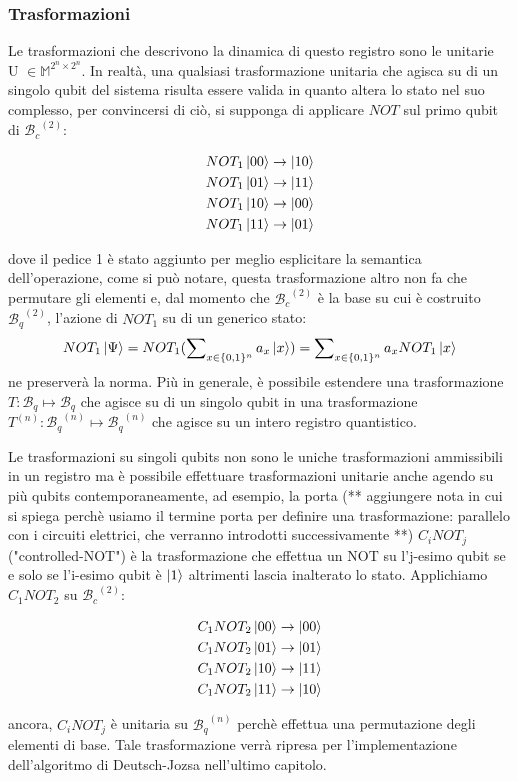 \documentclass[12pt,a4paper,openright]{report}
\begin{document}
\subsubsection{Trasformazioni}

Le trasformazioni che descrivono la dinamica di questo registro sono le unitarie \\U $\in \mathbb{M}^{2^n\times2^n}$.
In realtà, una qualsiasi trasformazione unitaria che agisca su di un singolo qubit del sistema risulta essere valida in quanto altera lo stato nel suo complesso,
per convincersi di ciò, si supponga di applicare $NOT$ sul primo qubit di ${\mathcal{B}_c}^{(2)}$:
\begin{center}
    \begin{align*}
        &NOT_1\ket{00} \rightarrow  \ket{10} \\
        &NOT_1\ket{01} \rightarrow  \ket{11} \\
        &NOT_1\ket{10} \rightarrow  \ket{00} \\
        &NOT_1\ket{11} \rightarrow  \ket{01}
    \end{align*}
\end{center}
dove il pedice 1 è stato aggiunto per meglio esplicitare la semantica dell'operazione, come si può notare, questa trasformazione altro non fa che permutare gli elementi
e, dal momento che ${\mathcal{B}_c}^{(2)}$ è la base su cui è costruito ${\mathcal{B}_q}^{(2)}$, l'azione di $NOT_1$ su di un generico stato:
\[
    NOT_1\ket{\Psi} = NOT_1(\sum\nolimits_{x \in \{0,1\}^{n}} a_x \ket{x}) = \sum\nolimits_{x \in \{0,1\}^{n}} a_x NOT_1\ket{x}
\] 
ne preserverà la norma. Più in generale, è possibile estendere una trasformazione $T: \mathcal{B}_q \mapsto \mathcal{B}_q$ che agisce su di un singolo qubit
in una trasformazione $T^{(n)}: {\mathcal{B}_q}^{(n)} \mapsto {\mathcal{B}_q}^{(n)}$ che agisce su un intero registro quantistico.\par
Le trasformazioni su singoli qubits non sono le uniche trasformazioni ammissibili in un registro ma è possibile effettuare trasformazioni unitarie anche agendo su più qubits contemporaneamente,
ad esempio, la porta (** aggiungere nota in cui si spiega perchè usiamo il termine porta per definire una trasformazione: parallelo con i circuiti elettrici, che verranno introdotti successivamente **) 
$C_iNOT_j$ ("controlled-NOT") è la trasformazione che effettua un NOT su l'j-esimo qubit se e solo se l'i-esimo qubit è $\ket1$ altrimenti lascia inalterato lo stato. Applichiamo $C_1NOT_2$ su ${\mathcal{B}_c}^{(2)}$:
\begin{center}
    \begin{align*}
        &C_1NOT_2\ket{00} \rightarrow  \ket{00} \\
        &C_1NOT_2\ket{01} \rightarrow  \ket{01} \\
        &C_1NOT_2\ket{10} \rightarrow  \ket{11} \\
        &C_1NOT_2\ket{11} \rightarrow  \ket{10}
    \end{align*}
\end{center}
ancora, $C_iNOT_j$ è unitaria su ${\mathcal{B}_q}^{(n)}$ perchè effettua una permutazione degli elementi di base. Tale trasformazione verrà ripresa per l'implementazione dell'algoritmo di Deutsch-Jozsa nell'ultimo
capitolo.
\end{document}
